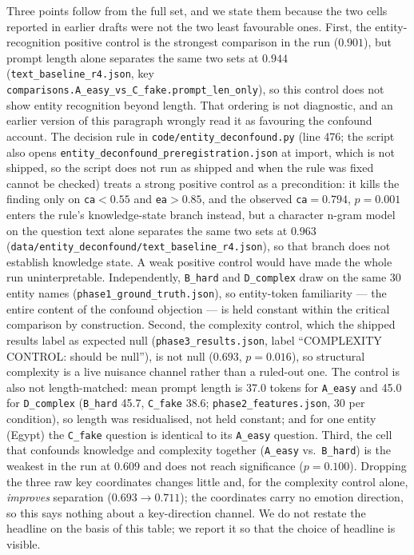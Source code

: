 \documentclass[11pt,a4paper]{article}
\begin{document}
Three points follow from the full set, and we state them because the two
cells reported in earlier drafts were not the two least favourable ones.
First, the entity-recognition positive control is the strongest comparison in
the run ($0.901$), but prompt length alone separates the same two sets at $0.944$ (\texttt{text\_baseline\_r4.json}, key \texttt{comparisons.\allowbreak A\_easy\_vs\_C\_fake.\allowbreak prompt\_len\_only}), so this control does not show entity recognition beyond length. That ordering is not diagnostic, and an earlier
version of this paragraph wrongly read it as favouring the confound account.
The decision rule in \texttt{code/entity\_deconfound.py} (line 476; the script also opens \texttt{entity\_deconfound\_preregistration.json} at import, which is not shipped, so the script does not run as shipped and when the rule was fixed cannot be checked) treats a strong positive control as a
precondition: it kills the finding only on
\texttt{ca}${<}0.55$ and \texttt{ea}${>}0.85$, and the observed
\texttt{ca}${=}0.794$, $p{=}0.001$ enters the rule's knowledge-state branch instead, but a character n-gram model on the question text alone separates the same two sets at $0.963$ (\texttt{data/\allowbreak entity\_deconfound/\allowbreak text\_baseline\_r4.json}), so that branch does not establish knowledge state.
A weak positive control would have made the whole run uninterpretable.
Independently, \texttt{B\_hard} and \texttt{D\_complex} draw on the
same 30 entity names (\texttt{phase1\_ground\_truth.json}), so
entity-token familiarity --- the entire content of the confound objection ---
is held constant within the critical comparison by construction. Second, the complexity control, which the shipped results label as expected null (\texttt{phase3\_results.json}, label ``COMPLEXITY CONTROL: should be null''), is not null ($0.693$, $p{=}0.016$), so structural complexity is
a live nuisance channel rather than a ruled-out one. The control is also not length-matched: mean prompt length is 37.0 tokens for \texttt{A\_easy} and 45.0 for \texttt{D\_complex} (\texttt{B\_hard} 45.7, \texttt{C\_fake} 38.6; \texttt{phase2\_features.json}, 30 per condition), so length was residualised, not held constant; and for one entity (Egypt) the \texttt{C\_fake} question is identical to its \texttt{A\_easy} question. Third, the cell that
confounds knowledge and complexity together (\texttt{A\_easy} vs.\
\texttt{B\_hard}) is the weakest in the run at $0.609$ and does not reach
significance ($p{=}0.100$). Dropping the three raw key coordinates
changes little and, for the complexity control alone, \emph{improves}
separation ($0.693 \to 0.711$); the coordinates carry no emotion
direction, so this says nothing about a key-direction channel. We do not restate the
headline on the basis of this table; we report it so that the choice of
headline is visible.
\end{document}
